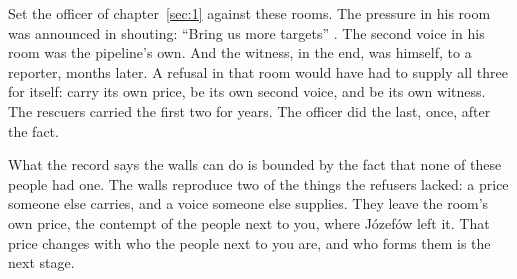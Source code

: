 Set the officer of chapter~\ref{sec:1} against these rooms. The pressure in his room was announced in shouting: “Bring us more targets” \autocite{abraham2024lavender}. The second voice in his room was the pipeline's own. And the witness, in the end, was himself, to a reporter, months later. A refusal in that room would have had to supply all three for itself: carry its own price, be its own second voice, and be its own witness. The rescuers carried the first two for years. The officer did the last, once, after the fact.

What the record says the walls can do is bounded by the fact that none of these people had one. The walls reproduce two of the things the refusers lacked: a price someone else carries, and a voice someone else supplies. They leave the room's own price, the contempt of the people next to you, where Józefów left it. That price changes with who the people next to you are, and who forms them is the next stage.
